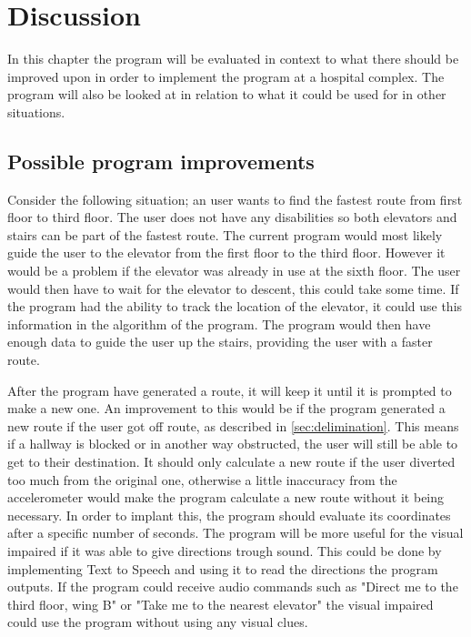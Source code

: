 \chapter{Discussion}

In this chapter the program will be evaluated in context to what there should be improved upon in order to implement the program at a hospital complex. The program will also be looked at in relation to what it could be used for in other situations.

\section{Possible program improvements}

Consider the following situation; an user wants to find the fastest route from first floor to third floor. The user does not have any disabilities so both elevators and stairs can be part of the fastest route. The current program would most likely guide the user to the elevator from the first floor to the third floor. However it would be a problem if the elevator was already in use at the sixth floor. The user would then have to wait for the elevator to descent, this could take some time. If the program had the ability to track the location of the elevator, it could use this information in the algorithm of the program. The program would then have enough data to guide the user up the stairs, providing the user with a faster route.

After the program have generated a route, it will keep it until it is prompted to make a new one. An improvement to this would be if the program generated a new route if the user got off route, as described in \cref{sec:delimination}. This means if a hallway is blocked or in another way obstructed, the user will still be able to get to their destination. It should only calculate a new route if the user diverted too much from the original one, otherwise a little inaccuracy from the accelerometer would make the program calculate a new route without it being necessary. In order to implant this, the program should evaluate its coordinates after a specific number of seconds.
The program will be more useful for the visual impaired if it was able to give directions trough sound. This could be done by implementing Text to Speech \cite{diss_tss} and using it to read the directions the program outputs. If the program could receive audio commands such as "Direct me to the third floor, wing B" or "Take me to the nearest elevator" the visual impaired could use the program without using any visual clues.

